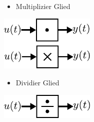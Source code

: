 \begin{figure}[h]
\begin{subfigure}[c]{\textwidth}
\begin{minipage}{0.5\textwidth}
		\end{minipage}
	\end{subfigure}
	\vspace{1cm}
	\begin{subfigure}[c]{\textwidth}
		\begin{minipage}{0.5\textwidth}
			\begin{itemize}
				\item Multiplizier Glied
			\end{itemize}
		\end{minipage}\hfill
		\begin{minipage}{0.5\textwidth}
			\centering
			\includegraphics[width=0.5\textwidth]{Abbildungen/Modellbildung/PDF/Multiplizierer.pdf}
		\end{minipage}
	\end{subfigure}
	\begin{subfigure}[c]{\textwidth}
		\begin{minipage}{0.5\textwidth}
			\begin{itemize}
				\item Dividier Glied
			\end{itemize}
		\end{minipage}
		\begin{minipage}{0.5\textwidth}
			\centering
			\includegraphics[width=0.5\textwidth]{Abbildungen/Modellbildung/PDF/Dividierer.pdf}
		\end{minipage}
	\end{subfigure} 
\end{figure}
%
